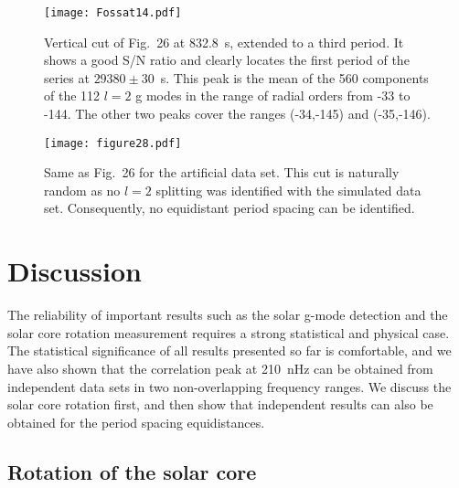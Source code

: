 \documentclass[bibyear]{aa}
\begin{document}
\begin{figure}
\centering
\texttt{[image: Fossat14.pdf]}
\caption{Vertical cut of Fig.~26 at 832.8~s, extended to a third period. It shows a good S/N ratio and clearly locates the first period of the series at $29380\pm 30$~s. This peak is the mean of the 560 components of the 112 $l=2$ g modes in the range of radial orders from -33 to -144. The other two peaks cover the ranges (-34,-145) and (-35,-146).}
\label{fig:C2_cut}
\end{figure} 


\begin{figure}
\centering
\texttt{[image: figure28.pdf]}
\caption{Same as Fig.~26 for the artificial data set. This cut is naturally random as no $l=2$ splitting was identified with the simulated data set. Consequently,  no equidistant period spacing can be identified.}
\label{fig:C2_simu}
\end{figure} 




\section{Discussion}

The reliability of important results such as the solar g-mode detection and the solar core rotation measurement requires a strong statistical and physical case.  The statistical significance of all results presented so far is comfortable, and we have also shown that the correlation peak at 210~nHz can be obtained from independent data sets  in two non-overlapping frequency ranges. We discuss the solar core rotation first, and then show that independent results can also be obtained for the period spacing equidistances. 


\subsection{Rotation of the solar core}
\end{document}
